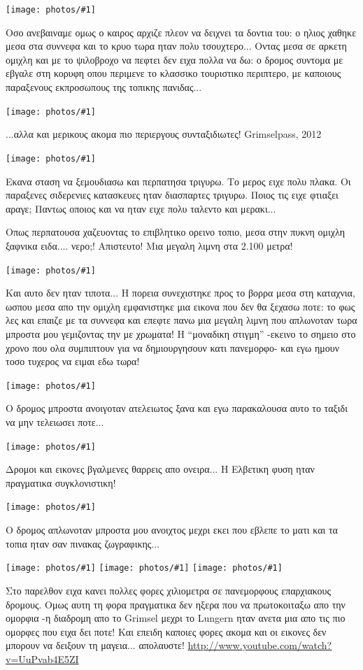 \documentclass[11pt, letterpaper]{book}
\newcommand\photo[1]{\noindent\texttt{[image: photos/\#1]}}
\begin{document}
\photo{63.jpg}

Οσο ανεβαιναμε ομως ο καιρος αρχιζε πλεον να δειχνει τα δοντια του: ο ηλιος χαθηκε μεσα στα συννεφα και το κρυο τωρα ηταν πολυ τσουχτερο... 
Οντας μεσα σε αρκετη ομιχλη και με το ψιλοβροχο να πεφτει δεν ειχα πολλα να δω: ο δρομος συντομα με εβγαλε στη κορυφη οπου περιμενε το κλασσικο τουριστικο περιπτερο, με καποιους παραξενους εκπροσωπους της τοπικης πανιδας...

\photo{64.jpg}

...αλλα και μερικους ακομα πιο περιεργους συνταξιδιωτες!
Grimselpass, 2012

\photo{65.jpg}

Εκανα σταση να ξεμουδιασω και περπατησα τριγυρω. Το μερος ειχε πολυ πλακα. Οι παραξενες σιδερενιες κατασκευες ηταν διασπαρτες τριγυρω. Ποιος τις ειχε φτιαξει αραγε; Παντως οποιος και να ηταν ειχε πολυ ταλεντο και μερακι...

Οπως περπατουσα χαζευοντας το επιβλητικο ορεινο τοπιο, μεσα στην πυκνη ομιχλη ξαφνικα ειδα.... νερο;! Απιστευτο! Μια μεγαλη λιμνη στα 2.100 μετρα! 

\photo{66.jpg}

Και αυτο δεν ηταν τιποτα...
Η πορεια συνεχιστηκε προς το βορρα μεσα στη καταχνια, ωσπου μεσα απο την ομιχλη εμφανιστηκε μια εικονα που δεν θα ξεχασω ποτε: το φως λες και επαιζε με τα συννεφα και επεφτε πανω μια μεγαλη λιμνη που απλωνοταν τωρα μπροστα μου γεμιζοντας την με χρωματα! 
Η ``μοναδικη στιγμη'' -εκεινο το σημειο στο χρονο που ολα συμπιπτουν για να δημιουργησουν κατι πανεμορφο- και εγω ημουν τοσο τυχερος να ειμαι εδω τωρα!

\photo{67.jpg}

Ο δρομος μπροστα ανοιγοταν ατελειωτος ξανα και εγω παρακαλουσα αυτο το ταξιδι να μην τελειωσει ποτε...

\photo{68.jpg}

Δρομοι και εικονες βγαλμενες θαρρεις απο ονειρα... Η Ελβετικη φυση ηταν πραγματικα συγκλονιστικη!

\photo{69.jpg}

Ο δρομος απλωνοταν μπροστα μου ανοιχτος μεχρι εκει που εβλεπε το ματι και τα τοπια ηταν σαν πινακας ζωγραφικης...

\photo{70.jpg}
\photo{71.jpg}
\photo{72.jpg}

Στο παρελθον ειχα κανει πολλες φορες χιλιομετρα σε πανεμορφους επαρχιακους δρομους. Ομως αυτη τη φορα πραγματικα δεν ηξερα που να πρωτοκοιταξω απο την ομορφια -η διαδρομη απο το Grimsel μεχρι το Lungern ηταν ανετα μια απο τις πιο ομορφες που ειχα δει ποτε! Και επειδη καποιες φορες ακομα και οι εικονες δεν μπορουν να δειξουν τη μαγεια... απολαυστε! \url{http://www.youtube.com/watch?v=UuPvab4E5ZI}
\end{document}
